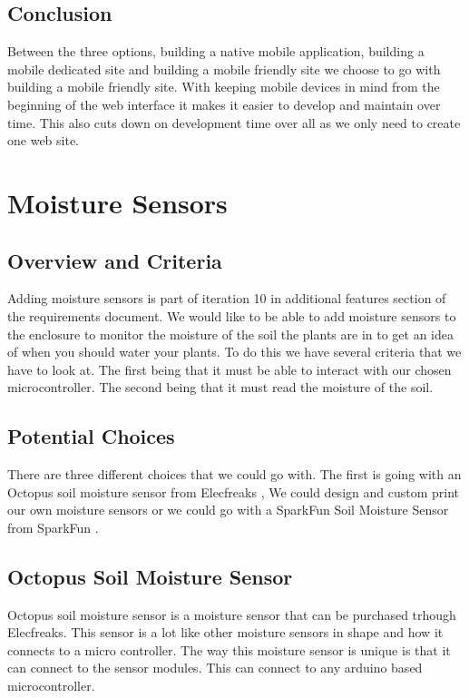 \documentclass[onecolumn, draftclsnofoot,10pt, compsoc]{IEEEtran}
\begin{document}
		\subsection{Conclusion}
		Between the three options, building a native mobile application, building a
		mobile dedicated site and building a mobile friendly site we choose to go with
		building a mobile friendly site. With keeping mobile devices in mind from the
		beginning of the web interface it makes it easier to develop and maintain over
		time. This also cuts down on development time over all as we only need to
		create one web site.


	\section{Moisture Sensors}
		\subsection{Overview and Criteria}
		Adding  moisture sensors is part of iteration 10 in additional features section
		of the requirements document. We would like to be able to add moisture sensors
		to the enclosure to monitor the moisture of the soil the plants are in to
		get an idea of when you should water your plants. To do this we have several
		criteria that we have to look at. The first being that it must be able to
		interact with our chosen microcontroller. The second being that it must
		read the moisture of the soil.
		\subsection{Potential Choices }
		There are three different choices that we could go with. The first is going
		with an Octopus soil moisture sensor from Elecfreaks \cite[pg 2] {Octopus_soil_sensor},
		We could design and custom print our own moisture sensors or we could go with
		a  SparkFun Soil Moisture Sensor from SparkFun \cite[pg 2] {SparkFun_Soil_Moisture_Sensor}.
		\subsection{Octopus Soil Moisture Sensor}
		Octopus soil moisture sensor is a moisture sensor that can be purchased trhough
		Elecfreaks. This sensor is a lot like other moisture sensors in shape and how
		it connects to a micro controller. The way this moisture sensor is unique is
		that it can connect to the sensor modules. This can connect to any arduino
		based microcontroller.
\end{document}
